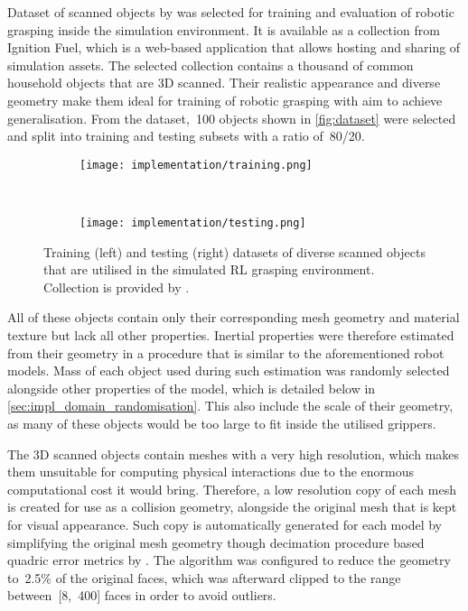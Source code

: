 Dataset of scanned objects by \citet{googleresearch_google_2020} was selected for training and evaluation of robotic grasping inside the simulation environment. It is available as a collection from Ignition Fuel, which is a web-based application that allows hosting and sharing of simulation assets. The selected collection contains a thousand of common household objects that are 3D scanned. Their realistic appearance and diverse geometry make them ideal for training of robotic grasping with aim to achieve generalisation. From the dataset,~100 objects shown in \autoref{fig:dataset} were selected and split into training and testing subsets with a ratio of~80/20.

\begin{figure}[ht]
    \centering
    \begin{subfigure}[ht]{0.792\textwidth}
        \begin{flushleft}%
            \texttt{[image: implementation/training.png]}
        \end{flushleft}%
    \end{subfigure}%
    \vrule~%
    \begin{subfigure}[ht]{0.198\textwidth}
        \begin{flushright}%
            \texttt{[image: implementation/testing.png]}
        \end{flushright}%
    \end{subfigure}%
    \caption{Training (left) and testing (right) datasets of diverse scanned objects that are utilised in the simulated RL grasping environment. Collection is provided by \citet{googleresearch_google_2020}.}
    \label{fig:dataset}
\end{figure}

All of these objects contain only their corresponding mesh geometry and material texture but lack all other properties. Inertial properties were therefore estimated from their geometry in a procedure that is similar to the aforementioned robot models. Mass of each object used during such estimation was randomly selected alongside other properties of the model, which is detailed below in \autoref{sec:impl_domain_randomisation}. This also include the scale of their geometry, as many of these objects would be too large to fit inside the utilised grippers.

The 3D scanned objects contain meshes with a very high resolution, which makes them unsuitable for computing physical interactions due to the enormous computational cost it would bring. Therefore, a low resolution copy of each mesh is created for use as a collision geometry, alongside the original mesh that is kept for visual appearance. Such copy is automatically generated for each model by simplifying the original mesh geometry though decimation procedure based quadric error metrics by \citet{garland_surface_1997}. The algorithm was configured to reduce the geometry to~2.5\% of the original faces, which was afterward clipped to the range between~[8,~400] faces in order to avoid outliers.


